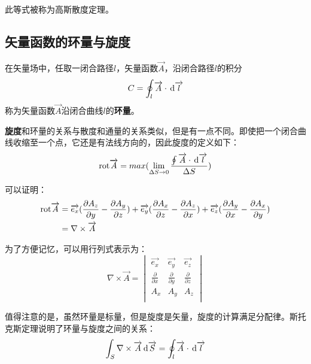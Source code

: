 \documentclass[UTF8,a4paper,11pt]{article}
\begin{document}
此等式被称为高斯散度定理。

\subsection{矢量函数的环量与旋度}
在矢量场中，任取一闭合路径$l$，矢量函数$\overrightarrow{A}$，沿闭合路径$l$的积分
\begin{equation}
C=\oint_l {\overrightarrow{A}}\cdot \,{\rm d}\overrightarrow{l}
\end{equation}
称为矢量函数$\overrightarrow{A}$沿闭合曲线$l$的\textbf{环量}。

\textbf{旋度}和环量的关系与散度和通量的关系类似，但是有一点不同。即使把一个闭合曲线收缩至一个点，它还是有法线方向的，因此旋度的定义如下：
\begin{equation}
{\rm rot}\overrightarrow{A}=max(\lim_{\Delta S \to 0} \frac{\oint {\overrightarrow{A}}\cdot \,{\rm d}\overrightarrow{l}}{\Delta S})
\end{equation}

可以证明：
\begin{equation}
\begin{aligned}
{\rm rot}\overrightarrow{A}&=\overrightarrow{e_x}(\frac{\partial A_z}{\partial y}-\frac{\partial A_y}{\partial z})+\overrightarrow{e_y}(\frac{\partial A_x}{\partial z}-\frac{\partial A_z}{\partial x})+\overrightarrow{e_z}(\frac{\partial A_y}{\partial x}-\frac{\partial A_x}{\partial y}) \\
&=\nabla\times\overrightarrow{A}
\end{aligned}
\end{equation}

为了方便记忆，可以用行列式表示为：
\begin{equation}
\nabla\times\overrightarrow{A}=\begin{vmatrix}
\overrightarrow{e_x} & \overrightarrow{e_y} &\overrightarrow{e_z} \\
\frac{\partial}{\partial x} & \frac{\partial}{\partial y} & \frac{\partial}{\partial z} \\
A_x & A_y & A_z \\
\end{vmatrix}
\end{equation}

值得注意的是，虽然环量是标量，但是旋度是矢量，旋度的计算满足分配律。斯托克斯定理说明了环量与旋度之间的关系：
\begin{equation}
\int_S \nabla\times\overrightarrow{A} \,{\rm d}\overrightarrow{S}=\oint_l {\overrightarrow{A}}\cdot \,{\rm d}\overrightarrow{l}
\end{equation}
\end{document}

